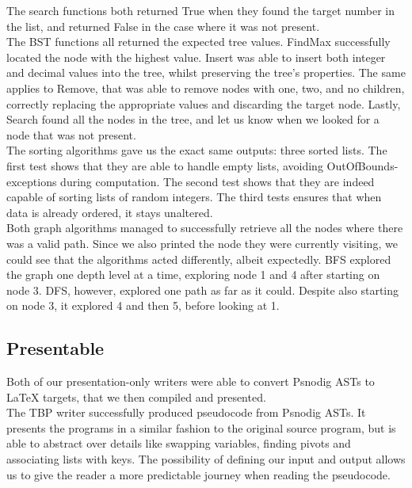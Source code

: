 The search functions both returned True when they found the target number in the list, and returned False in the case where it was not present. \\

The BST functions all returned the expected tree values. FindMax successfully located the node with the highest value. Insert was able to insert both integer and decimal values into the tree, whilst preserving the tree's properties. The same applies to Remove, that was able to remove nodes with one, two, and no children, correctly replacing the appropriate values and discarding the target node. Lastly, Search found all the nodes in the tree, and let us know when we looked for a node that was not present. \\

The sorting algorithms gave us the exact same outputs: three sorted lists. The first test shows that they are able to handle empty lists, avoiding OutOfBounds-exceptions during computation. The second test shows that they are indeed capable of sorting lists of random integers. The third tests ensures that when data is already ordered, it stays unaltered. \\

Both graph algorithms managed to successfully retrieve all the nodes where there was a valid path. Since we also printed the node they were currently visiting, we could see that the algorithms acted differently, albeit expectedly. BFS explored the graph one depth level at a time, exploring node 1 and 4 after starting on node 3. DFS, however, explored one path as far as it could. Despite also starting on node 3, it explored 4 and then 5, before looking at 1.

\subsection{Presentable}

Both of our presentation-only writers were able to convert Psnodig ASTs to LaTeX targets, that we then compiled and presented. \\

The TBP writer successfully produced pseudocode from Psnodig ASTs. It presents the programs in a similar fashion to the original source program, but is able to abstract over details like swapping variables, finding pivots and associating lists with keys. The possibility of defining our input and output allows us to give the reader a more predictable journey when reading the pseudocode. \\

